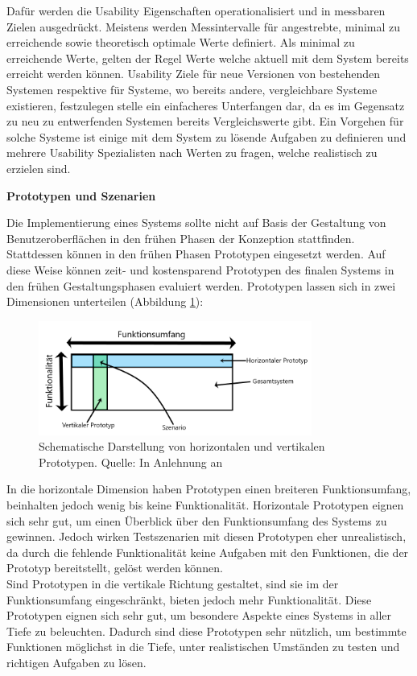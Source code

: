 Dafür werden die Usability Eigenschaften operationalisiert und in messbaren Zielen ausgedrückt. Meistens werden Messintervalle für angestrebte, minimal zu erreichende
sowie theoretisch optimale Werte definiert. Als minimal zu erreichende Werte, gelten der Regel Werte welche aktuell mit dem System bereits erreicht werden können. 
Usability Ziele für neue Versionen von bestehenden Systemen respektive für Systeme, wo bereits andere, vergleichbare Systeme existieren, festzulegen stelle ein einfacheres Unterfangen dar, da es im Gegensatz zu neu zu entwerfenden Systemen bereits Vergleichswerte gibt. Ein Vorgehen für solche Systeme ist einige mit dem System zu lösende Aufgaben zu definieren und mehrere Usability Spezialisten nach Werten zu fragen, welche realistisch zu erzielen sind.

\vspace{5mm} 
\textbf{Prototypen und Szenarien}

\cite[S.~93]{Nielsen1994} Die Implementierung eines Systems sollte nicht auf Basis der Gestaltung von Benutzeroberflächen in den frühen Phasen der Konzeption stattfinden. 
Stattdessen können in den frühen Phasen Prototypen eingesetzt werden. Auf diese Weise können zeit- und kostensparend Prototypen des finalen Systems in den frühen Gestaltungsphasen
evaluiert werden. Prototypen lassen sich in zwei Dimensionen unterteilen (Abbildung \ref{img:ver_hor_protptypes}): 

\begin{figure}[H]
	\centering
	\includegraphics[width=0.8\textwidth]{resources/fundamentals/hor_ver_prototypes.png}
	\caption{Schematische Darstellung von horizontalen und vertikalen Prototypen. Quelle: In Anlehnung an \cite[S.~94]{Nielsen1994}}
	\label{img:ver_hor_protptypes}
\end{figure}

In die horizontale Dimension haben Prototypen einen breiteren Funktionsumfang, beinhalten jedoch wenig bis keine Funktionalität. Horizontale Prototypen eignen sich sehr gut, um einen Überblick über den Funktionsumfang des Systems zu gewinnen. Jedoch wirken Testszenarien mit diesen Prototypen eher unrealistisch, da durch die fehlende Funktionalität keine Aufgaben mit den Funktionen, die der Prototyp 
bereitstellt, gelöst werden können.\\
Sind Prototypen in die vertikale Richtung gestaltet, sind sie im der Funktionsumfang eingeschränkt, bieten jedoch mehr Funktionalität. Diese Prototypen eignen sich sehr gut, um 
besondere Aspekte eines Systems in aller Tiefe zu beleuchten. Dadurch sind diese Prototypen sehr nützlich, um bestimmte Funktionen möglichst in die Tiefe, unter realistischen 
Umständen zu testen und richtigen Aufgaben zu lösen.


